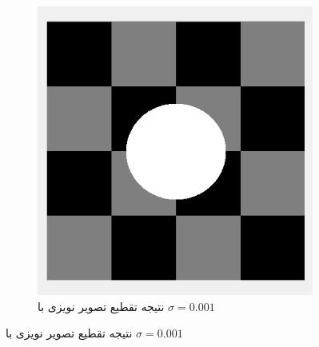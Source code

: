\documentclass[11.5pt,a4paper]{article}
\begin{document}
\begin{figure}[h]
\begin{subfigure}{.3\textwidth}
		\includegraphics[scale=0.2]{Imgs/NB_S001_Res.png}
		\caption{نتیجه تقطیع تصویر نویزی با $\sigma=0.001$}
	\end{subfigure}


\end{figure}
\end{document}
